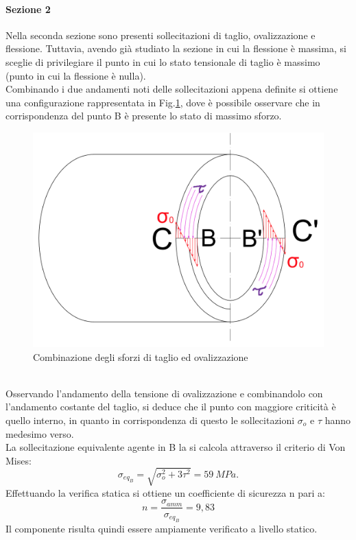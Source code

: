 \paragraph{Sezione 2}Nella seconda sezione sono presenti sollecitazioni di taglio, ovalizzazione e  flessione. Tuttavia, avendo già studiato la sezione in cui la flessione è massima, si sceglie di privilegiare il punto in cui lo stato tensionale di taglio è massimo (punto in cui la flessione è nulla).\\
Combinando i due andamenti noti delle sollecitazioni appena definite si ottiene una configurazione rappresentata in Fig.\ref{fig:Sezione2Spinotto}, dove è possibile osservare che in corrispondenza del punto B è presente lo stato di massimo sforzo.\\
\begin{figure}[h]
    \centering
    \includegraphics[scale=0.3]{Immagini/Sezione2Spinotto.png}
    \caption{Combinazione degli sforzi di taglio ed ovalizzazione}
    \label{fig:Sezione2Spinotto}
\end{figure}
\\
Osservando l'andamento della tensione di ovalizzazione e combinandolo con l'andamento costante del taglio, si deduce che il punto con maggiore criticità è quello interno, in quanto in corrispondenza di questo le sollecitazioni $\sigma_o$ e $\tau$ hanno medesimo verso.\\
La sollecitazione equivalente agente in B la si calcola attraverso il criterio di Von Mises:
\begin{equation}
    \sigma_{eq_{B}}=\sqrt{\sigma_o^2+3\tau^2}=59\ MPa.
\end{equation}
Effettuando la verifica statica si ottiene un coefficiente di sicurezza n pari a:
\begin{equation}
    n=\frac{\sigma_{amm}}{\sigma_{eq_{B}}}=9,83
\end{equation}
Il componente risulta quindi essere ampiamente verificato a livello statico. 
